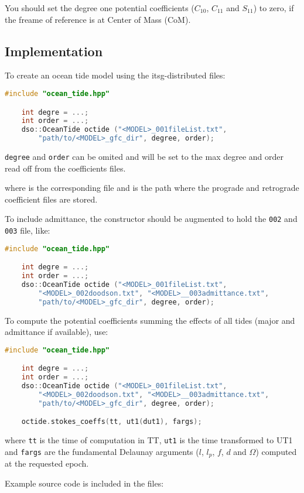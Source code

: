 \begin{warning}
    You should set the degree one potential coefficients ($C_{10}$, $C_{11}$ and $S_{11}$) to zero, 
    if the freame of reference is at Center of Mass (CoM).
\end{warning}

\subsection{Implementation}
To create an ocean tide model using the \gls{itsg}-distributed files:
\begin{lstlisting}[language=C++, basicstyle=\footnotesize\ttfamily, frame=single]
    #include "ocean_tide.hpp"

    int degre = ...;
    int order = ...;
    dso::OceanTide octide ("<MODEL>_001fileList.txt", 
        "path/to/<MODEL>_gfc_dir", degree, order);
\end{lstlisting}

\texttt{degree} and \texttt{order} can be omited and will be set to the max degree and 
order read off from the coefficients files.

where  is the corresponding  file and 
 is the path where the prograde and retrograde coefficient files 
are stored.

To include admittance, the constructor should be augmented to hold the \texttt{002} and \texttt{003} 
file, like:
\begin{lstlisting}[language=C++, basicstyle=\footnotesize\ttfamily, frame=single]
    #include "ocean_tide.hpp"

    int degre = ...;
    int order = ...;
    dso::OceanTide octide ("<MODEL>_001fileList.txt", 
        "<MODEL>_002doodson.txt", "<MODEL>__003admittance.txt", 
        "path/to/<MODEL>_gfc_dir", degree, order);
\end{lstlisting}

To compute the potential coefficients summing the effects of all tides (major and admittance if 
available), use:
\begin{lstlisting}[language=C++, basicstyle=\footnotesize\ttfamily, frame=single]
    #include "ocean_tide.hpp"

    int degre = ...;
    int order = ...;
    dso::OceanTide octide ("<MODEL>_001fileList.txt", 
        "<MODEL>_002doodson.txt", "<MODEL>__003admittance.txt", 
        "path/to/<MODEL>_gfc_dir", degree, order);

    octide.stokes_coeffs(tt, ut1(dut1), fargs);
\end{lstlisting}

where \texttt{tt} is the time of computation in \gls{TT}, \texttt{ut1} is the time transformed to 
\gls{UT1} and \texttt{fargs} are the fundamental Delaunay arguments ($l$, $l_p$, $f$, $d$ and 
$\Omega$) computed at the requested epoch.

Example source code is included in the files: 
